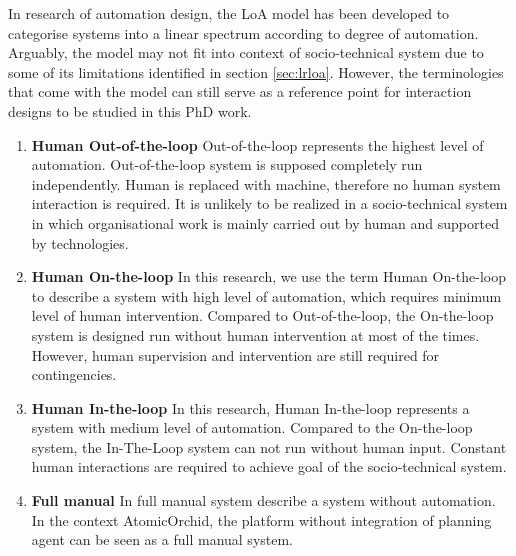 In research of automation design, the \ac{LoA} model has been developed to categorise systems into a linear spectrum according to degree of automation. Arguably, the model may not fit into context of socio-technical system due to some of its limitations identified in section \ref{sec:lrloa}. However, the terminologies that come with the model can still serve as a reference point for interaction designs to be studied in this PhD work.


\begin{enumerate}
\item \textbf{Human Out-of-the-loop}
Out-of-the-loop represents the highest level of automation. Out-of-the-loop system is supposed completely run independently. Human is replaced with machine, therefore no human system interaction is required. It is unlikely to be realized in a socio-technical system in which organisational work is mainly carried out by human and supported by technologies.  \\

\item \textbf{Human On-the-loop}
In this research, we use the term Human On-the-loop to describe a system with high level of automation, which requires minimum level of human intervention. Compared to Out-of-the-loop, the On-the-loop system is designed run without human intervention at most of the times. However, human supervision and intervention are still required for contingencies. 

\item \textbf{Human In-the-loop}
In this research, Human In-the-loop represents  a system with medium level of automation. Compared to the On-the-loop system, the In-The-Loop system can not run without human input. Constant human interactions are required to achieve goal of the socio-technical system. \\

\item \textbf{Full manual}
In full manual system describe a system without automation. In the context AtomicOrchid, the platform without integration of planning agent  can be seen as a full manual system. 

\end{enumerate}

